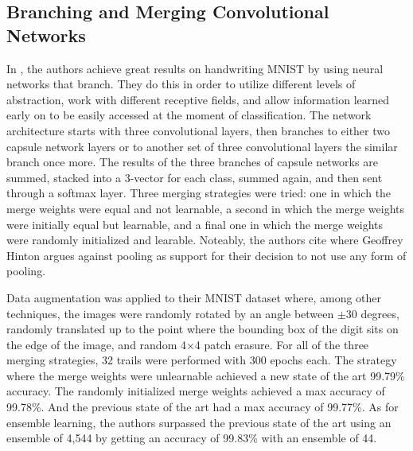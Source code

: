 \documentclass{IEEEtran}
\begin{document}
\subsection{Branching and Merging Convolutional Networks}
In \cite{byerly2020branching}, the authors achieve great results on
handwriting MNIST by using neural networks that branch. They do this in order to
utilize different levels of abstraction, work with different receptive fields,
and allow information learned early on to be easily accessed at the moment of
classification. The network architecture starts with three convolutional layers,
then branches to either two capsule network layers or to another set of three
convolutional layers the similar branch once more. The results of the three
branches of capsule networks are summed, stacked into a 3-vector for each class,
summed again, and then sent through a softmax layer. Three merging strategies
were tried: one in which the merge weights were equal and not learnable,
a second in which the merge weights were initially equal but learnable, and a
final one in which the merge weights were randomly initialized and learable.
Noteably, the authors cite \cite{hinton2014CNNs} where Geoffrey Hinton argues
against pooling as support for their decision to not use any form of pooling.

Data augmentation was applied to their MNIST dataset where, among other
techniques, the images were randomly rotated by an angle between \(\pm 30\)
degrees, randomly translated up to the point where the bounding box of the digit
sits on the edge of the image, and random 4×4 patch erasure. For all of the
three merging strategies, 32 trails were performed with 300 epochs each. The
strategy where the merge weights were unlearnable achieved a new state of the
art 99.79\% accuracy. The randomly initialized merge weights achieved a max
accuracy of 99.78\%. And the previous state of the art had a max accuracy of
99.77\%. As for ensemble learning, the authors surpassed the previous state of
the art using an ensemble of 4,544 by getting an accuracy of 99.83\% with an
ensemble of 44.
\end{document}
